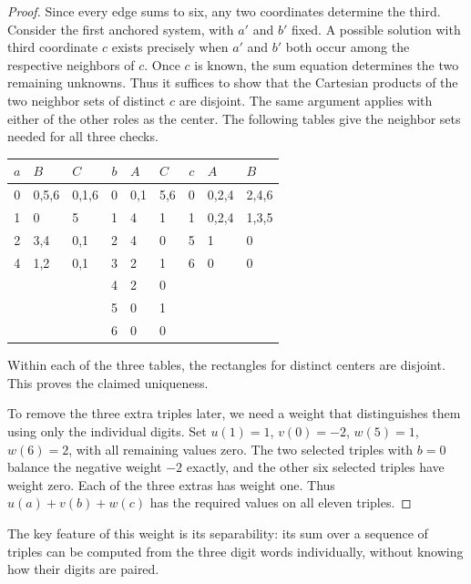 \documentclass[11pt,a4paper]{article}
\begin{document}
\begin{proof}
Since every edge sums to six, any two coordinates determine the third. Consider the first anchored system, with $a'$ and $b'$ fixed. A possible solution with third coordinate $c$ exists precisely when $a'$ and $b'$ both occur among the respective neighbors of $c$. Once $c$ is known, the sum equation determines the two remaining unknowns. Thus it suffices to show that the Cartesian products of the two neighbor sets of distinct $c$ are disjoint. The same argument applies with either of the other roles as the center. The following tables give the neighbor sets needed for all three checks.
\begin{center}
\begin{tabular}{c ll@{\qquad}c ll@{\qquad}c ll}
\toprule
$a$ & $B$ & $C$ & $b$ & $A$ & $C$ & $c$ & $A$ & $B$\\
\midrule
0 & 0,5,6 & 0,1,6 & 0 & 0,1 & 5,6 & 0 & 0,2,4 & 2,4,6\\
1 & 0 & 5 & 1 & 4 & 1 & 1 & 0,2,4 & 1,3,5\\
2 & 3,4 & 0,1 & 2 & 4 & 0 & 5 & 1 & 0\\
4 & 1,2 & 0,1 & 3 & 2 & 1 & 6 & 0 & 0\\
  & & & 4 & 2 & 0 & & &\\
  & & & 5 & 0 & 1 & & &\\
  & & & 6 & 0 & 0 & & &\\
\bottomrule
\end{tabular}
\end{center}
Within each of the three tables, the rectangles for distinct centers are disjoint. This proves the claimed uniqueness.

To remove the three extra triples later, we need a weight that distinguishes them using only the individual digits. Set $u(1)=1$, $v(0)=-2$, $w(5)=1$, $w(6)=2$, with all remaining values zero. The two selected triples with $b=0$ balance the negative weight $-2$ exactly, and the other six selected triples have weight zero. Each of the three extras has weight one. Thus $u(a)+v(b)+w(c)$ has the required values on all eleven triples.
\end{proof}
The key feature of this weight is its separability: its sum over a sequence of triples can be computed from the three digit words individually, without knowing how their digits are paired.
\end{document}
